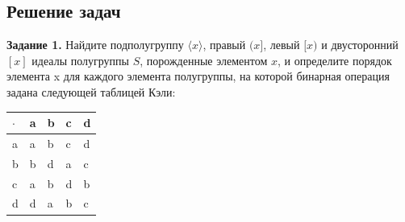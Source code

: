 \documentclass[bachelor, och, labwork]{shiza}
\begin{document}

    \subsection{Решение задач}
      \textbf{Задание 1.} Найдите подполугруппу $\langle x \rangle$, правый $(x]$, левый $[x)$ и двусторонний $[x]$ идеалы
      полугруппы $S$, порожденные элементом $x$, и определите порядок элемента x для каждого элемента полугруппы, на
      которой бинарная операция задана следующей таблицей Кэли:
        \begin{table}[H]
            \centering
            \begin{tabular}{|l|l|l|l|l|}
            \hline
            $\cdot$ & a & b & c & d \\ \hline
            a & a & b & c & d \\ \hline
            b & b & d & a & c \\ \hline
            c & a & b & d & b \\ \hline
            d & d & a & b & c \\ \hline
        \end{tabular}
        \end{table}
\end{document}

